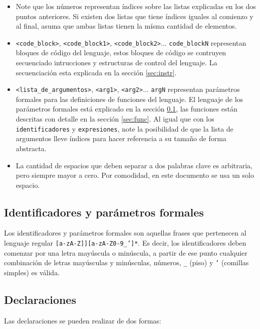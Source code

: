 \documentclass[12pt, spanish]{report}
\begin{document}
\begin{itemize}
\item Note que los n\'umeros representan \'indices sobre las listas
  explicadas en los dos puntos anteriores. Si existen dos listas que
  tiene \'indices iguales al comienzo y al final, asuma que ambas listas
  tienen la m\'isma cantidad de elementos.
       
\item \texttt{<code\_block>}, \texttt{<code\_block1>},
  \texttt{<code\_block2>}...  \texttt{code\_blockN} representan
  bloques de c\'odigo del lenguaje, estos bloques de c\'odigo se
  contruyen secuenciado intrucciones y estructuras de control del
  lenguaje. La secuenciaci\'on esta explicada en la secci\'on
  \ref{sec:instr}.
       
\item \texttt{<lista\_de\_argumentos>}, \texttt{<arg1>},
  \texttt{<arg2>}...  \texttt{argN} representan par\'ametros formales
  para las definiciones de funciones del lenguaje. El lenguaje de los
  par\'ametros formales est\'a explicado en la secci\'on
  \ref{sec:ident}, las funciones est\'an descritas con detalle en la
  secci\'on \ref{sec:func}. Al igual que con los
  \texttt{identificadores} y \texttt{expresiones}, note la posibilidad
  de que la lista de argumentos lleve \'indices para hacer referencia a
  su tamaño de forma abstracta.
       
\item La cantidad de espacios que deben separar a dos palabras clave
  es arbitraria, pero siempre mayor a cero. Por comodidad, en este
  documento se usa un solo espacio.
\end{itemize}

\subsection{Identificadores y par\'ametros formales}
\label{sec:ident}
Los identificadores y par\'ametros formales son aquellas frases que
pertenecen al lenguaje regular \texttt{[a-zA-Z]][a-zA-Z0-9\_']*}. Es
decir, los identificadores deben comenzar por una letra may\'uscula o
min\'uscula, a partir de ese punto cualquier combinaci\'on de letras
may\'usculas y min\'usculas, n\'umeros, \texttt{\_} (piso) y
\texttt{'} (comillas simples) es v\'alida.

\subsection{Declaraciones}
\label{sec:decl}

Las declaraciones se pueden realizar de dos formas:\\
\end{document}
